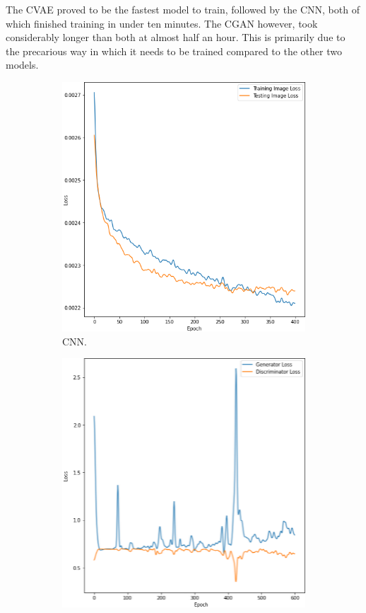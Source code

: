 \documentclass{l4proj}
\begin{document}
The CVAE proved to be the fastest model to train, followed by the CNN, both of which finished training in under ten minutes. The CGAN however, took considerably longer than both at almost half an hour. This is primarily due to the precarious way in which it needs to be trained compared to the other two models.

\begin{figure}[H]
    \centering
    \begin{subfigure}[b]{0.3\textwidth}
        \includegraphics[width=\textwidth]{images/DCNNTime.png}
        \caption{CNN.}
        \label{fig:dcnntime}
    \end{subfigure}
    \begin{subfigure}[b]{0.3\textwidth}
        \includegraphics[width=\textwidth]{images/CGANTime.png}

\end{subfigure}
\end{figure}
\end{document}
